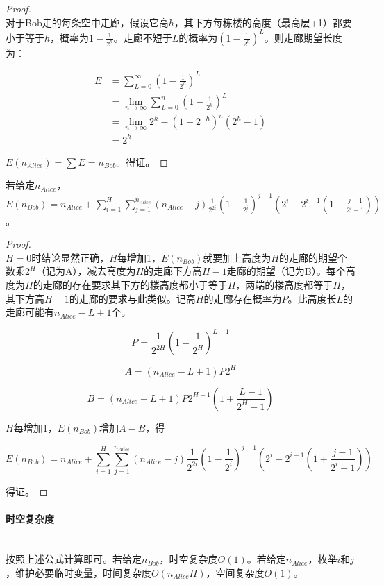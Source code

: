\documentclass[UTF8]{ctexart}
\newcommand{\myparagraph}[1]{\paragraph{#1}\mbox{}\\}
\theoremstyle{nonumberplain}
\newtheorem{proof}{\hspace{1em}证明：}
\begin{document}
			\begin{proof}\mbox{}\\
			
				对于Bob走的每条空中走廊，假设它高$h$，其下方每栋楼的高度（最高层+1）都要小于等于$h$，概率为$1-\frac{1}{2^h}$。走廊不短于$L$的概率为$(1-\frac{1}{2^h})^L$。则走廊期望长度为：
				
				$$\begin{aligned}
					E&=\sum_{L=0}^\infty(1-\frac{1}{2^h})^L\\
					 &=\lim_{n \to \infty} \sum_{L=0}^n(1-\frac{1}{2^h})^L\\
					 &=\lim_{n \to \infty} 2^h-(1-2^{-h})^n(2^h-1)\\
					 &=2^h
				\end{aligned}$$
				
				$E(n_{Alice})=\sum E=n_{Bob}$。得证。
			
			\end{proof}
			
			若给定$n_{Alice}$，$E(n_{Bob})=n_{Alice}+\sum_{i=1}^{H}\sum_{j=1}^{n_{Alice}}(n_{Alice}-j)\frac{1}{2^{2i}}(1-\frac{1}{2^i})^{j-1}(2^i-2^{i-1}(1+\frac{j-1}{2^i-1}))$。
			
			\begin{proof}\mbox{}\\
			
				$H=0$时结论显然正确，$H$每增加1，$E(n_{Bob})$就要加上高度为$H$的走廊的期望个数乘$2^H$（记为A），减去高度为$H$的走廊下方高$H-1$走廊的期望（记为B）。每个高度为$H$的走廊的存在要求其下方的楼高度都小于等于$H$，两端的楼高度都等于$H$，其下方高$H-1$的走廊的要求与此类似。记高$H$的走廊存在概率为$P$。此高度长$L$的走廊可能有$n_{Alice}-L+1$个。
				
				$$P=\frac{1}{2^{2H}}(1-\frac{1}{2^H})^{L-1}$$
				
				$$A=(n_{Alice}-L+1)P2^H$$
				
				$$B=(n_{Alice}-L+1)P2^{H-1}(1+\frac{L-1}{2^H-1})$$
				
				$H$每增加1，$E(n_{Bob})$增加$A-B$，得
				
				$$E(n_{Bob})=n_{Alice}+\sum_{i=1}^{H}\sum_{j=1}^{n_{Alice}}(n_{Alice}-j)\frac{1}{2^{2i}}(1-\frac{1}{2^i})^{j-1}(2^i-2^{i-1}(1+\frac{j-1}{2^i-1}))$$
				
				得证。
			
			\end{proof}
			
		\myparagraph{时空复杂度}
		
			按照上述公式计算即可。若给定$n_{Bob}$，时空复杂度$O(1)$。若给定$n_{Alice}$，枚举$i$和$j$，维护必要临时变量，时间复杂度$O(n_{Alice}H)$，空间复杂度$O(1)$。
	
\end{document}
